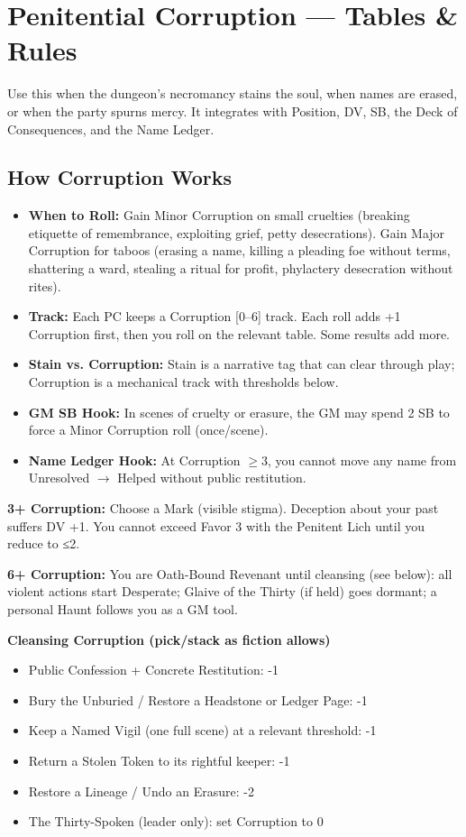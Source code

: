 \documentclass[18pt, letterpaper, twoside]{article}
\newcommand{\corruptiontitle}[1]{\subsection*{#1}}
\newcommand{\threshold}[2]{\noindent\textbf{#1+ Corruption:} #2\par}
\begin{document}
\section{Penitential Corruption --- Tables \& Rules}

Use this when the dungeon's necromancy stains the soul, when names are erased, or when the party spurns mercy. It integrates with Position, DV, SB, the Deck of Consequences, and the Name Ledger.

\corruptiontitle{How Corruption Works}
\begin{itemize}
    \item \textbf{When to Roll:} Gain Minor Corruption on small cruelties (breaking etiquette of remembrance, exploiting grief, petty desecrations). Gain Major Corruption for taboos (erasing a name, killing a pleading foe without terms, shattering a ward, stealing a ritual for profit, phylactery desecration without rites).
    \item \textbf{Track:} Each PC keeps a Corruption [0--6] track. Each roll adds +1 Corruption first, then you roll on the relevant table. Some results add more.
    \item \textbf{Stain vs. Corruption:} Stain is a narrative tag that can clear through play; Corruption is a mechanical track with thresholds below.
    \item \textbf{GM SB Hook:} In scenes of cruelty or erasure, the GM may spend 2 SB to force a Minor Corruption roll (once/scene).
    \item \textbf{Name Ledger Hook:} At Corruption $\geq$3, you cannot move any name from Unresolved $\rightarrow$ Helped without public restitution.
\end{itemize}

\threshold{3}{Choose a Mark (visible stigma). Deception about your past suffers DV +1. You cannot exceed Favor 3 with the Penitent Lich until you reduce to ≤2.}
\threshold{6}{You are Oath-Bound Revenant until cleansing (see below): all violent actions start Desperate; Glaive of the Thirty (if held) goes dormant; a personal Haunt follows you as a GM tool.}

\textbf{Cleansing Corruption (pick/stack as fiction allows)}
\begin{itemize}
    \item Public Confession + Concrete Restitution: -1
    \item Bury the Unburied / Restore a Headstone or Ledger Page: -1
    \item Keep a Named Vigil (one full scene) at a relevant threshold: -1
    \item Return a Stolen Token to its rightful keeper: -1
    \item Restore a Lineage / Undo an Erasure: -2
    \item The Thirty-Spoken (leader only): set Corruption to 0
\end{itemize}
\end{document}

